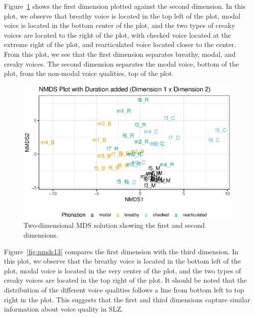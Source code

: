 Figure~\ref{fig:nmds12} shows the first dimension plotted against the second dimension. In this plot, we observe that breathy voice is located in the top left of the plot, modal voice is located in the bottom center of the plot, and the two types of creaky voices are located to the right of the plot, with checked voice located at the extreme right of the plot, and rearticulated voice located closer to the center. From this plot, we see that the first dimension separates breathy, modal, and creaky voices. The second dimension separates the modal voice, bottom of the plot, from the non-modal voice qualities, top of the plot.

\begin{figure}[h!]
    \centering
    \includegraphics[width = 0.9\linewidth]{images/MDS/nmds12_dur.eps}
    \caption{Two-dimensional MDS solution showing the first and second dimensions.}
    \label{fig:nmds12}
\end{figure}


Figure~\ref{fig:nmds13} compares the first dimension with the third dimension. In this plot, we observe that the breathy voice is located in the bottom left of the plot, modal voice is located in the very center of the plot, and the two types of creaky voices are located in the top right of the plot. It should be noted that the distribution of the different voice qualities follows a line from bottom left to top right in the plot. This suggests that the first and third dimensions capture similar information about voice quality in SLZ.


